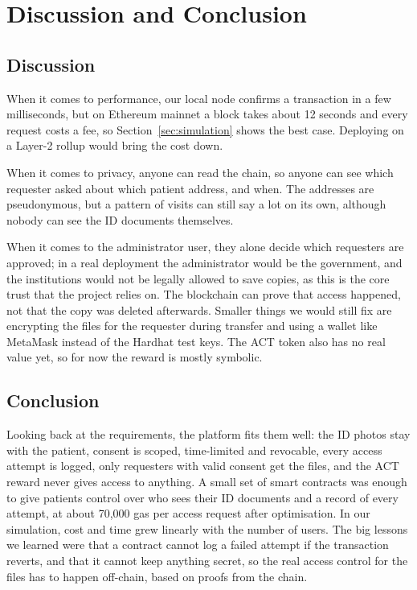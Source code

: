 \documentclass[10pt,a4paper]{article}
\begin{document}
\section{Discussion and Conclusion}
\label{sec:discussion}

\subsection{Discussion}

When it comes to performance, our local node confirms a transaction in a few milliseconds, but on Ethereum mainnet a block takes about 12 seconds and every request costs a fee, so Section~\ref{sec:simulation} shows the best case. Deploying on a Layer-2 rollup would bring the cost down.

When it comes to privacy, anyone can read the chain, so anyone can see which requester asked about which patient address, and when. The addresses are pseudonymous, but a pattern of visits can still say a lot on its own, although nobody can see the ID documents themselves.

When it comes to the administrator user, they alone decide which requesters are approved; in a real deployment the administrator would be the government, and the institutions would not be legally allowed to save copies, as this is the core trust that the project relies on. The blockchain can prove that access happened, not that the copy was deleted afterwards. Smaller things we would still fix are encrypting the files for the requester during transfer and using a wallet like MetaMask instead of the Hardhat test keys. The ACT token also has no real value yet, so for now the reward is mostly symbolic.

\subsection{Conclusion}

Looking back at the requirements, the platform fits them well: the ID photos stay with the patient, consent is scoped, time-limited and revocable, every access attempt is logged, only requesters with valid consent get the files, and the ACT reward never gives access to anything. A small set of smart contracts was enough to give patients control over who sees their ID documents and a record of every attempt, at about 70,000 gas per access request after optimisation. In our simulation, cost and time grew linearly with the number of users. The big lessons we learned were that a contract cannot log a failed attempt if the transaction reverts, and that it cannot keep anything secret, so the real access control for the files has to happen off-chain, based on proofs from the chain.
\end{document}

